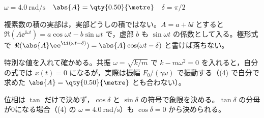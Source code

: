 $\omega=\qty{4.0}{\radian\per\second}$　$\abs{A}=\qty{0.50}{\metre}$　$\delta=\pi/2$
\item 複素数の積の実部は，実部どうしの積ではない。$A=a+b\ii$ とすると $\Re(A\ee^{\ii\omega t})=a\cos\omega t-b\sin\omega t$ で，虚部 $b$ も $\sin\omega t$ の係数として入る。極形式で $\Re(\abs{A}\ee^{\ii(\omega t-\delta)})=\abs{A}\cos(\omega t-\delta)$ と書けば落ちない。
\item 特別な値を入れて確かめる。共振 $\omega=\sqrt{k/m}$ で $k-m\omega^{2}=0$ を入れると，自分の式では $x(t)=0$ になるが，実際は振幅 $F_{0}/(\gamma\omega)$ で振動する（(4) で自分で求めた $\abs{A}=\qty{0.50}{\metre}$ とも合わない）。
\item 位相は $\tan$ だけで決めず，$\cos\delta$ と $\sin\delta$ の符号で象限を決める。$\tan\delta$ の分母が0になる場合（(4) の $\omega=\qty{4.0}{\radian\per\second}$）も $\cos\delta=0$ から決められる。
